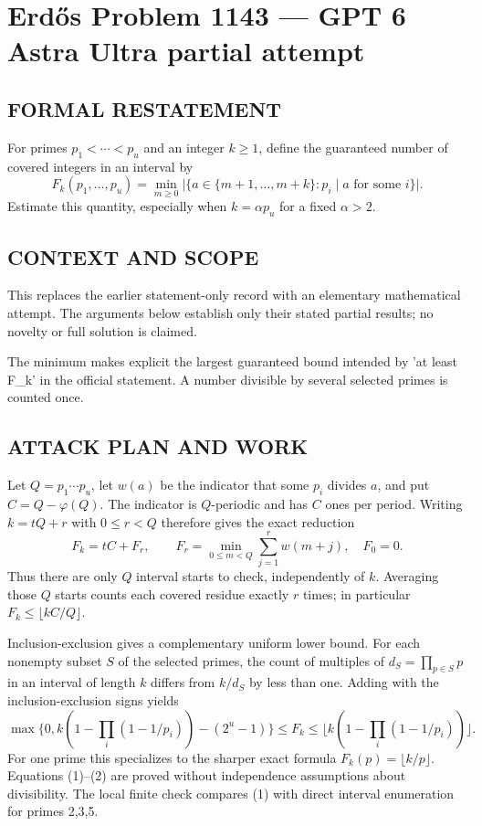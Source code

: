 \section*{Erd\H{o}s Problem 1143 --- GPT 6 Astra Ultra partial attempt}


\subsection*{FORMAL RESTATEMENT}
For primes $p_1<\cdots<p_u$ and an integer $k\geq1$, define the guaranteed number of covered integers in an interval by
\[
F_k(p_1,\ldots,p_u)=\min_{m\geq0}\bigl|\{a\in\{m+1,\ldots,m+k\}:p_i\mid a\text{ for some }i\}\bigr|.
\]
Estimate this quantity, especially when $k=\alpha p_u$ for a fixed $\alpha>2$.

\subsection*{CONTEXT AND SCOPE}
This replaces the earlier statement-only record with an elementary mathematical attempt. The arguments below establish only their stated partial results; no novelty or full solution is claimed.

The minimum makes explicit the largest guaranteed bound intended by 'at least F_k' in the official statement. A number divisible by several selected primes is counted once.

\subsection*{ATTACK PLAN AND WORK}
Let $Q=p_1\cdots p_u$, let $w(a)$ be the indicator that some $p_i$ divides $a$,
and put $C=Q-\varphi(Q)$. The indicator is $Q$-periodic and has $C$ ones per period.
Writing $k=tQ+r$ with $0\le r<Q$ therefore gives the exact reduction
\[F_k=tC+F_r,\qquad
F_r=\min_{0\le m<Q}\sum_{j=1}^r w(m+j),\quad F_0=0.\tag{1}\]
Thus there are only $Q$ interval starts to check, independently of $k$.
Averaging those $Q$ starts counts each covered residue exactly $r$ times;
in particular $F_k\le\lfloor kC/Q\rfloor$.

Inclusion-exclusion gives a complementary uniform lower bound. For each
nonempty subset $S$ of the selected primes, the count of multiples of
$d_S=\prod_{p\in S}p$ in an interval of length $k$ differs from $k/d_S$ by less
than one. Adding with the inclusion-exclusion signs yields
\[
\max\{0,k(1-\prod_i(1-1/p_i))-(2^u-1)\}
\le F_k\le\lfloor k(1-\prod_i(1-1/p_i))\rfloor.\tag{2}
\]
For one prime this specializes to the sharper exact formula $F_k(p)=\lfloor k/p\rfloor$.
Equations (1)--(2) are proved without independence assumptions about divisibility.
The local finite check compares (1) with direct interval enumeration for primes 2,3,5.

